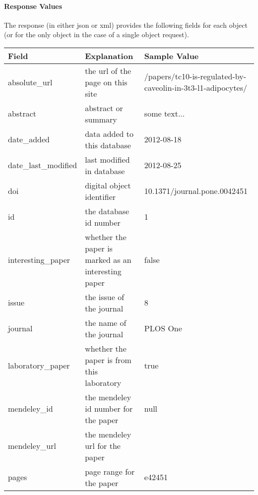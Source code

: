 \documentclass[letterpaper,10pt,english]{sphinxmanual}
\begin{document}
\paragraph{Response Values}
\label{papers:response-values}
The response (in either json or xml) provides the following fields for each object (or for the only object in the case of a single object request).

\begin{tabulary}{\linewidth}{|L|L|L|}
\hline
\textbf{
Field
} & \textbf{
Explanation
} & \textbf{
Sample Value
}\\\hline

absolute\_url
 & 
the url of the page on this site
 & 
/papers/tc10-is-regulated-by-caveolin-in-3t3-l1-adipocytes/
\\\hline

abstract
 & 
abstract or summary
 & 
some text...
\\\hline

date\_added
 & 
data added to this database
 & 
2012-08-18
\\\hline

date\_last\_modified
 & 
last modified in database
 & 
2012-08-25
\\\hline

doi
 & 
digital object identifier
 & 
10.1371/journal.pone.0042451
\\\hline

id
 & 
the database id number
 & 
1
\\\hline

interesting\_paper
 & 
whether the paper is marked as an interesting paper
 & 
false
\\\hline

issue
 & 
the issue of the journal
 & 
8
\\\hline

journal
 & 
the name of the journal
 & 
PLOS One
\\\hline

laboratory\_paper
 & 
whether the paper is from this laboratory
 & 
true
\\\hline

mendeley\_id
 & 
the mendeley id number for the paper
 & 
null
\\\hline

mendeley\_url
 & 
the mendeley url for the paper
 & \\\hline

pages
 & 
page range for the paper
 & 
e42451
\\\hline


\end{tabulary}
\end{document}

